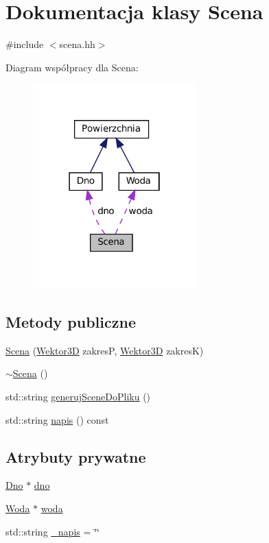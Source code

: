 \hypertarget{class_scena}{}\section{Dokumentacja klasy Scena}
\label{class_scena}


{\ttfamily \#include $<$scena.\+hh$>$}



Diagram współpracy dla Scena\+:\nopagebreak
\begin{figure}[H]
\begin{center}
\leavevmode
\includegraphics[width=178pt]{class_scena__coll__graph}
\end{center}
\end{figure}
\subsection*{Metody publiczne}
\begin{DoxyCompactItemize}
\item 
\mbox{\hyperlink{class_scena_a3ead38eb32ab7095a21d4e8c728531d4}{Scena}} (\mbox{\hyperlink{class_wektor3_d}{Wektor3D}} zakresP, \mbox{\hyperlink{class_wektor3_d}{Wektor3D}} zakresK)
\item 
\mbox{\hyperlink{class_scena_ad882b3d3c934c64c5e90a63246a47943}{$\sim$\+Scena}} ()
\item 
std\+::string \mbox{\hyperlink{class_scena_ade795937f5293d5671f9e4930998fc42}{generuj\+Scene\+Do\+Pliku}} ()
\item 
std\+::string \mbox{\hyperlink{class_scena_ab727dc0baa21dc3ef76f219f1d192e3f}{napis}} () const
\end{DoxyCompactItemize}
\subsection*{Atrybuty prywatne}
\begin{DoxyCompactItemize}
\item 
\mbox{\hyperlink{class_dno}{Dno}} $\ast$ \mbox{\hyperlink{class_scena_a166396f31572e88d87aedad307de19be}{dno}}
\item 
\mbox{\hyperlink{class_woda}{Woda}} $\ast$ \mbox{\hyperlink{class_scena_a031564e5e8422dc29e8dea5eff762f4d}{woda}}
\item 
std\+::string \mbox{\hyperlink{class_scena_a010d729b03bc1efaf244feb095e6ca80}{\+\_\+napis}} = \char`\"{}\char`\"{}
\end{DoxyCompactItemize}


